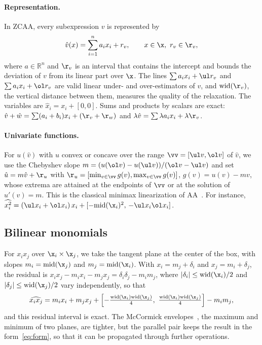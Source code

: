 \documentclass[10pt]{article}
\newcommand{\Rset}{\mathbb{R}}
\newcommand{\midp}{\mathrm{mid}}
\renewcommand{\wid}{\mathrm{wid}}
\begin{document}
\paragraph{Representation.} In ZCAA, every subexpression $v$ is represented by
\begin{equation}
\label{eq:form}
\hat v(x)=\sum_{i=1}^n a_i x_i + r_v,\qquad x\in\x,\ r_v\in\r_v,
\end{equation}
where $a\in\Rset^n$ and $\r_v$ is an interval that contains the intercept and bounds the deviation of $v$ from its linear part over $\x$. The lines $\sum a_ix_i+\ul r_v$ and $\sum a_ix_i+\ol r_v$ are valid linear under- and over-estimators of $v$, and $\wid(\r_v)$, the vertical distance between them, measures the quality of the relaxation. The variables are $\hat x_i = x_i + [0,0]$. Sums and products by scalars are exact: $\hat v+\hat w=\sum(a_i+b_i)x_i+(\r_v+\r_w)$ and $\lambda\hat v=\sum\lambda a_ix_i+\lambda\r_v$.

\paragraph{Univariate functions.} For $u(\hat v)$ with $u$ convex or concave over the range $\vv=[\ul v,\ol v]$ of $\hat v$, we use the Chebyshev slope $m=(u(\ol v)-u(\ul v))/(\ol v-\ul v)$ and set $\hat u=m\hat v+\r_u$ with $\r_u=[\min_{v\in\vv}g(v),\max_{v\in\vv}g(v)]$, $g(v)=u(v)-mv$, whose extrema are attained at the endpoints of $\vv$ or at the solution of $u'(v)=m$. This is the classical minimax linearization of AA~\cite{stolfi1997self}. For instance, $\widehat{x_i^2}=(\ul x_i+\ol x_i)\,x_i+[-\midp(\x_i)^2,\,-\ul x_i\ol x_i]$.

\subsection{Bilinear monomials}
\label{sec:bilinear}

For $x_ix_j$ over $\x_i\times\x_j$, we take the tangent plane at the center of the box, with slopes $m_i=\midp(\x_j)$ and $m_j=\midp(\x_i)$. With $x_i=m_j+\delta_i$ and $x_j=m_i+\delta_j$, the residual is $x_ix_j-m_ix_i-m_jx_j=\delta_i\delta_j-m_im_j$, where $|\delta_i|\le\wid(\x_i)/2$ and $|\delta_j|\le\wid(\x_j)/2$ vary independently, so that
\begin{equation}
\label{eq:bilinear}
\widehat{x_ix_j}=m_ix_i+m_jx_j+\left[-\tfrac{\wid(\x_i)\wid(\x_j)}{4},\ \tfrac{\wid(\x_i)\wid(\x_j)}{4}\right]-m_im_j,
\end{equation}
and this residual interval is exact. The McCormick envelopes~\cite{mccormick1976}, the maximum and minimum of two planes, are tighter, but the parallel pair keeps the result in the form~\eqref{eq:form}, so that it can be propagated through further operations.
\end{document}
